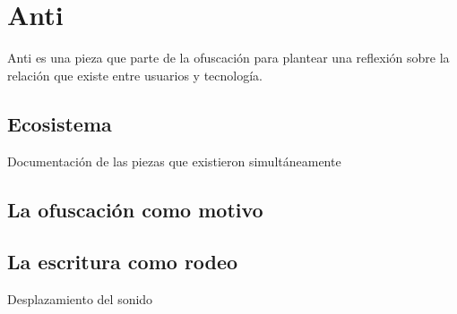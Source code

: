\section{Anti}


Anti es una pieza que parte de la ofuscación para plantear una reflexión sobre la relación que existe entre usuarios y tecnología.


\subsection{Ecosistema}

Documentación de las piezas que existieron simultáneamente 

\subsection{La ofuscación como motivo}

\subsection{La escritura como rodeo} %


Desplazamiento del sonido 


